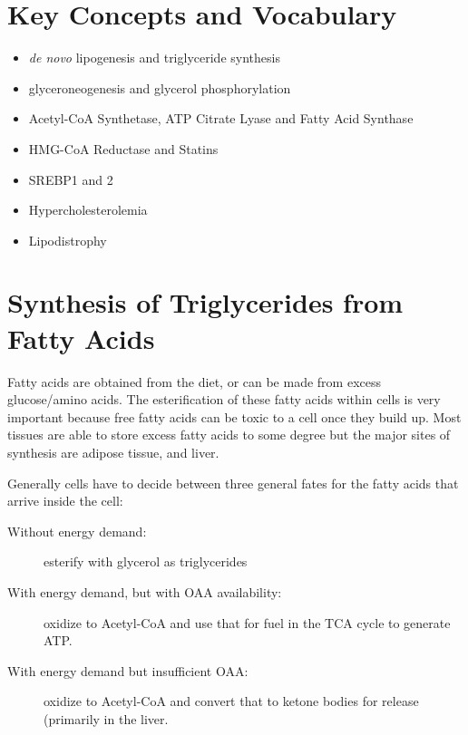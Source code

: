 \documentclass{tufte-handout}
\begin{document}
\section{Key Concepts and Vocabulary}
\begin{itemize}
\item \textit{de novo} lipogenesis and triglyceride synthesis
\item glyceroneogenesis and glycerol phosphorylation
\item Acetyl-CoA Synthetase, ATP Citrate Lyase and Fatty Acid Synthase
\item HMG-CoA Reductase and Statins
\item SREBP1 and 2
\item Hypercholesterolemia
\item Lipodistrophy

\end{itemize}

\section{Synthesis of Triglycerides from Fatty Acids}

Fatty acids are obtained from the diet, or can be made from excess glucose/amino acids.  The esterification of these fatty acids within cells is very important because free fatty acids can be toxic to a cell once they build up.  Most tissues are able to store excess fatty acids to some degree but the major sites of synthesis are adipose tissue, and liver.

Generally cells have to decide between three general fates for the fatty acids that arrive inside the cell:
\begin{description}
\item [Without energy demand:] esterify with glycerol as triglycerides
\item [With energy demand, but with OAA availability:] oxidize to Acetyl-CoA and use that for fuel in the TCA cycle to generate ATP.
\item [With energy demand but insufficient OAA:] oxidize to Acetyl-CoA and convert that to ketone bodies for release (primarily in the liver.
\end{description}
\end{document}
